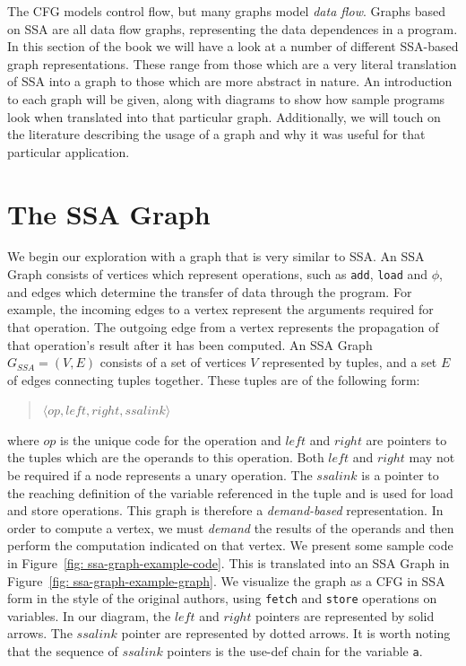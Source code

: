 The CFG models control flow, but many graphs model \textit{data flow}. Graphs based on SSA are all data flow graphs, representing the data dependences in a program. In this section of the book we will have a look at a number of different SSA-based graph representations. These range from those which are a very literal translation of SSA into a graph to those which are more abstract in nature. An introduction to each graph will be given, along with diagrams to show how sample programs look when translated into that particular graph. Additionally, we will touch on the literature describing the usage of a  graph and why it was useful for that particular application.


\section{The SSA Graph}

We begin our exploration with a graph that is very similar to SSA. An SSA Graph consists of vertices which represent operations, such as \texttt{add}, \texttt{load} and $\mathtt{\phi}$, and edges which determine the transfer of data through the program. For example, the incoming edges to a vertex represent the arguments required for that operation. The outgoing edge from a vertex represents the propagation of that operation's result after it has been computed. An SSA Graph $G_{SSA}=(V,E)$ consists of a set of vertices $V$ represented by tuples, and a set $E$ of edges connecting tuples together. These tuples are of the following form: 

\begin{quote}
\centering
$\langle op,left,right,ssalink\rangle$
\end{quote}

where $op$ is the unique code for the operation and $left$ and $right$ are pointers to the tuples which are the operands to this operation. Both $left$ and $right$ may not be required if a node represents a unary operation. The $ssalink$ is a pointer to the reaching definition of the variable referenced in the tuple and is used for load and store operations. This graph is therefore a \textit{demand-based} representation. In order to compute a vertex, we must \textit{demand} the results of the operands and then perform the computation indicated on that vertex. We present some sample code in Figure~\ref{fig: ssa-graph-example-code}. This is translated into an SSA Graph in Figure~\ref{fig: ssa-graph-example-graph}. We visualize the graph as a CFG in SSA form in the style of the original authors, using \texttt{fetch} and \texttt{store} operations on variables. In our diagram, the $left$ and $right$ pointers are represented by solid arrows. The $ssalink$ pointer are represented by dotted arrows. It is worth noting that the sequence of $ssalink$ pointers is the use-def chain for the variable \texttt{a}.

